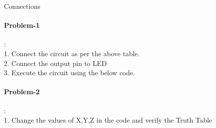 \documentclass[10pt, a4paper]{article}
\begin{document}
\begin{center}
    Connections
\end{center}

    \paragraph{Problem-1}:\\
    
    1. Connect the circuit as per the above table.\\
    2. Connect the output pin to LED\\
    3. Execute the circuit using the below code.\\

   \paragraph{Problem-2}:\\
1. Change the values of X,Y,Z in the code and verify the Truth Table\\



\end{document}
